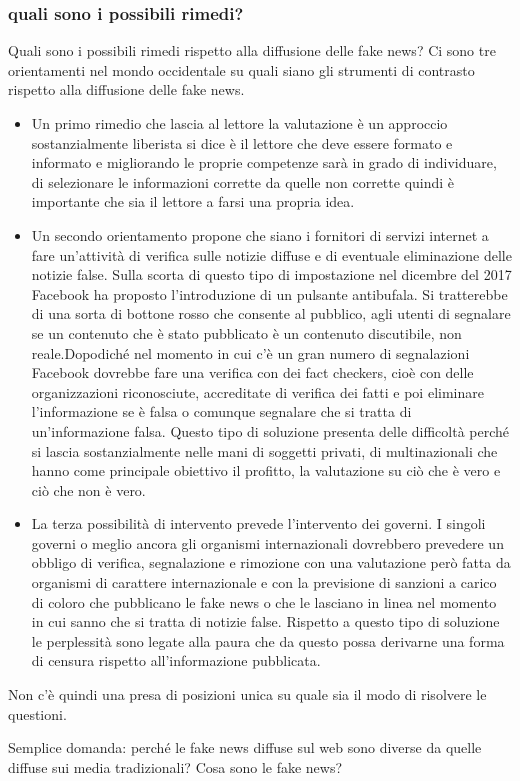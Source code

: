 \subsubsection{quali sono i possibili rimedi?}
Quali sono i possibili rimedi rispetto alla diffusione delle fake news? Ci sono tre orientamenti nel mondo occidentale su quali siano gli strumenti di contrasto rispetto alla diffusione delle fake news.
\begin{itemize}
    \item Un primo rimedio che lascia al lettore la valutazione è un approccio sostanzialmente liberista si dice è il lettore che deve essere formato e informato e migliorando le proprie competenze sarà in grado di individuare, di selezionare le informazioni corrette da quelle non corrette quindi è importante che sia il lettore a farsi una propria idea. 
    \item Un secondo orientamento propone che siano i fornitori di servizi internet a fare un'attività di verifica sulle notizie diffuse e di eventuale eliminazione delle notizie false. Sulla scorta di questo tipo di impostazione nel dicembre del 2017 Facebook ha proposto l'introduzione di un pulsante antibufala. Si tratterebbe di una sorta di bottone rosso che consente al pubblico, agli utenti di segnalare se un contenuto che è stato pubblicato è un contenuto discutibile, non reale.Dopodiché nel momento in cui c'è un gran numero di segnalazioni Facebook dovrebbe fare una verifica con dei fact checkers, cioè con delle organizzazioni riconosciute, accreditate di verifica dei fatti e poi eliminare l'informazione se è falsa o comunque segnalare che si tratta di un'informazione falsa. Questo tipo di soluzione presenta delle difficoltà perché si lascia sostanzialmente nelle mani di soggetti privati, di multinazionali che hanno come principale obiettivo il profitto, la valutazione su ciò che è vero e ciò che non è vero.
    \item La terza possibilità di intervento prevede l'intervento dei governi. I singoli governi o meglio ancora gli organismi internazionali dovrebbero prevedere un obbligo di verifica, segnalazione e rimozione con una valutazione però fatta da organismi di carattere internazionale e con la previsione di sanzioni a carico di coloro che pubblicano le fake news o che le lasciano in linea nel momento in cui sanno che si tratta di notizie false. Rispetto a questo tipo di soluzione le perplessità sono legate alla paura che da questo possa derivarne una forma di censura rispetto all'informazione pubblicata. 
\end{itemize} 

Non c'è quindi una presa di posizioni unica su quale sia il modo di risolvere le questioni.

Semplice domanda: perché le fake news diffuse sul web sono diverse da quelle diffuse sui media tradizionali? Cosa sono le fake news? 





